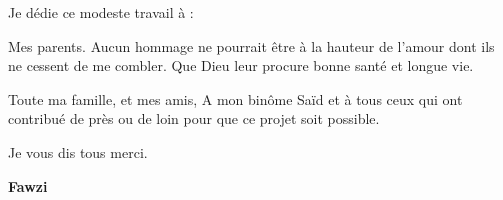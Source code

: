 
\vspace{1.5cm}

Je dédie ce modeste travail à :

Mes parents. Aucun hommage ne pourrait être à la hauteur de l’amour dont ils ne cessent de me combler. Que Dieu leur procure bonne santé et longue vie.

Toute ma famille, et mes amis, A mon binôme Saïd et à tous ceux qui ont contribué de près ou de loin pour que ce projet soit possible. 

Je vous dis tous merci.

\vspace{0.5cm}
\begin{center}
\Large
\hspace{12.5cm}
\textbf{Fawzi}
\end{center}
